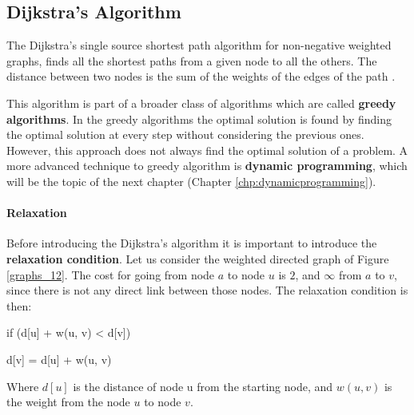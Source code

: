 \subsection{Dijkstra's Algorithm}
\label{sec:dijkstra}
The Dijkstra's single source shortest path algorithm for non-negative weighted graphs, finds all the shortest paths from a given node to all the others. The distance between two nodes is the sum of the weights of the edges of the path \cite{wikidijkstra}.

This algorithm is part of a broader class of algorithms which are called \textbf{greedy algorithms}. In the greedy algorithms the optimal solution is found by finding the optimal solution at every step without considering the previous ones. However, this approach does not always find the optimal solution of a problem. A more advanced technique to greedy algorithm is \textbf{dynamic programming}, which will be the topic of the next chapter (Chapter \ref{chp:dynamicprogramming}).

\paragraph{Relaxation}
Before introducing the Dijkstra's algorithm it is important to introduce the \textbf{relaxation condition}. Let us consider the weighted directed graph of Figure \ref{graphs_12}. The cost for going from node \(a\) to node \(u\) is \(2\), and \(\infty\) from \(a\) to \(v\), since there is not any direct link between those nodes. The relaxation condition is then:

\begin{definition}
\enspace \enspace \textnormal{if (d[u] + w(u, v) < d[v])}

\enspace \enspace \enspace     \textnormal{d[v] = d[u] + w(u, v)}

Where \(d[u]\) is the distance of node u from the starting node, and \(w(u, v)\) is the weight from the node \(u\) to node \(v\).
\end{definition}

